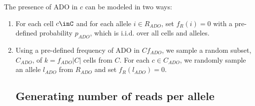 \documentclass[a4paper,11pt]{article}
\begin{document}
The presence of ADO in $c$ can be modeled in two ways:
\begin{enumerate}
\item For each cell $c\inC$ and for each allele $i\in R_{ADO}$, set
  $f_R(i)=0$ with a pre-defined probability $p_{ADO}$, which is
  i.i.d. over all cells and alleles.
\item Using a pre-defined frequency of ADO in
  $C$$f_{ADO}$, we sample a random subset,
  $C_{ADO}$, of $k=f_{ADO}|C|$ cells from $C$. For each $c\in
  C_{ADO}$, we randomly sample an allele $l_{ADO}$ from
  $R_{ADO}$ and set $f_R(l_{ADO})=0$.

\subsection{Generating number of reads per allele}
\label{sec:gener-numb-reads}











\end{enumerate}
\end{document}
